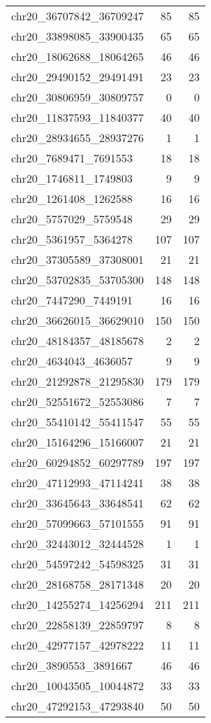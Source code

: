 \begin{longtable}{lrr}
chr20_36707842_36709247 & 85 & 85 \\
chr20_33898085_33900435 & 65 & 65 \\
chr20_18062688_18064265 & 46 & 46 \\
chr20_29490152_29491491 & 23 & 23 \\
chr20_30806959_30809757 & 0 & 0 \\
chr20_11837593_11840377 & 40 & 40 \\
chr20_28934655_28937276 & 1 & 1 \\
chr20_7689471_7691553 & 18 & 18 \\
chr20_1746811_1749803 & 9 & 9 \\
chr20_1261408_1262588 & 16 & 16 \\
chr20_5757029_5759548 & 29 & 29 \\
chr20_5361957_5364278 & 107 & 107 \\
chr20_37305589_37308001 & 21 & 21 \\
chr20_53702835_53705300 & 148 & 148 \\
chr20_7447290_7449191 & 16 & 16 \\
chr20_36626015_36629010 & 150 & 150 \\
chr20_48184357_48185678 & 2 & 2 \\
chr20_4634043_4636057 & 9 & 9 \\
chr20_21292878_21295830 & 179 & 179 \\
chr20_52551672_52553086 & 7 & 7 \\
chr20_55410142_55411547 & 55 & 55 \\
chr20_15164296_15166007 & 21 & 21 \\
chr20_60294852_60297789 & 197 & 197 \\
chr20_47112993_47114241 & 38 & 38 \\
chr20_33645643_33648541 & 62 & 62 \\
chr20_57099663_57101555 & 91 & 91 \\
chr20_32443012_32444528 & 1 & 1 \\
chr20_54597242_54598325 & 31 & 31 \\
chr20_28168758_28171348 & 20 & 20 \\
chr20_14255274_14256294 & 211 & 211 \\
chr20_22858139_22859797 & 8 & 8 \\
chr20_42977157_42978222 & 11 & 11 \\
chr20_3890553_3891667 & 46 & 46 \\
chr20_10043505_10044872 & 33 & 33 \\
chr20_47292153_47293840 & 50 & 50 \\

\end{longtable}
